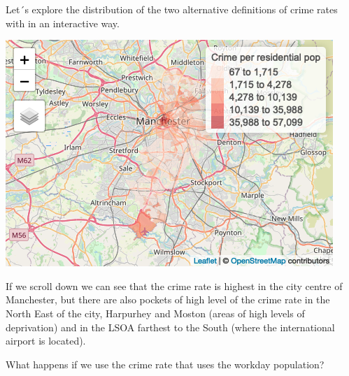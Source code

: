 \documentclass[
]{book}
\makeatletter
\newenvironment{Shaded}{\begin{snugshade}}{\end{snugshade}}
\newcommand{\AttributeTok}[1]{\textcolor[rgb]{0.61,0.61,0.61}{#1}}
\newcommand{\FloatTok}[1]{\textcolor[rgb]{0.06,0.06,0.06}{#1}}
\newcommand{\FunctionTok}[1]{\textcolor[rgb]{0,0,0}{#1}}
\newcommand{\NormalTok}[1]{#1}
\newcommand{\SpecialCharTok}[1]{\textcolor[rgb]{0,0,0}{#1}}
\newcommand{\StringTok}[1]{\textcolor[rgb]{0.5,0.5,0.5}{#1}}
\newenvironment{kframe}{%
\medskip{}
\setlength{\fboxsep}{.8em}
 \def\at@end@of@kframe{}%
 \ifinner\ifhmode%
  \def\at@end@of@kframe{\end{minipage}}%
  \begin{minipage}{\columnwidth}%
 \fi\fi%
 \def\FrameCommand##1{\hskip\@totalleftmargin \hskip-\fboxsep
 \colorbox{shadecolor}{##1}\hskip-\fboxsep
     \hskip-\linewidth \hskip-\@totalleftmargin \hskip\columnwidth}%
 \MakeFramed {\advance\hsize-\width
   \@totalleftmargin\z@ \linewidth\hsize
   \@setminipage}}%
 {\par\unskip\endMakeFramed%
 \at@end@of@kframe}
\renewenvironment{Shaded}{\begin{kframe}}{\end{kframe}}
\makeatother
\begin{document}
Let´s explore the distribution of the two alternative definitions of crime rates with in an interactive way.

\begin{Shaded}
\end{Shaded}

\includegraphics{crime_mapping_files/figure-latex/unnamed-chunk-103-1.png}

If we scroll down we can see that the crime rate is highest in the city centre of Manchester, but there are also pockets of high level of the crime rate in the North East of the city, Harpurhey and Moston (areas of high levels of deprivation) and in the LSOA farthest to the South (where the international airport is located).

What happens if we use the crime rate that uses the workday population?

\begin{Shaded}
\end{Shaded}
\end{document}
